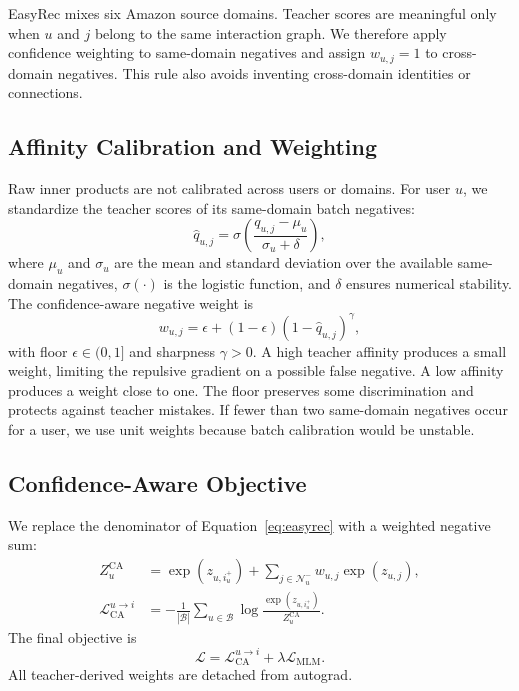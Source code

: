 \documentclass[11pt]{article}
\begin{document}
EasyRec mixes six Amazon source domains.
Teacher scores are meaningful only when $u$ and $j$ belong to the same interaction graph.
We therefore apply confidence weighting to same-domain negatives and assign $w_{u,j}=1$ to cross-domain negatives.
This rule also avoids inventing cross-domain identities or connections.

\subsection{Affinity Calibration and Weighting}

Raw inner products are not calibrated across users or domains.
For user $u$, we standardize the teacher scores of its same-domain batch negatives:
\begin{equation}
\hat q_{u,j}=
\sigma\left(\frac{q_{u,j}-\mu_u}{\sigma_u+\delta}\right),
\end{equation}
where $\mu_u$ and $\sigma_u$ are the mean and standard deviation over the available same-domain negatives, $\sigma(\cdot)$ is the logistic function, and $\delta$ ensures numerical stability.
The confidence-aware negative weight is
\begin{equation}
w_{u,j}=\epsilon+(1-\epsilon)(1-\hat q_{u,j})^\gamma,
\label{eq:weight}
\end{equation}
with floor $\epsilon\in(0,1]$ and sharpness $\gamma>0$.
A high teacher affinity produces a small weight, limiting the repulsive gradient on a possible false negative.
A low affinity produces a weight close to one.
The floor preserves some discrimination and protects against teacher mistakes.
If fewer than two same-domain negatives occur for a user, we use unit weights because batch calibration would be unstable.

\subsection{Confidence-Aware Objective}

We replace the denominator of Equation~\ref{eq:easyrec} with a weighted negative sum:
\begin{equation}
\begin{aligned}
Z_u^{\mathrm{CA}} &=
\exp(z_{u,i_u^+})+
\sum_{j\in\mathcal{N}_u^-}w_{u,j}\exp(z_{u,j}),\\
\mathcal{L}_{\mathrm{CA}}^{u\rightarrow i}
&=-\frac{1}{|\mathcal{B}|}\sum_{u\in\mathcal{B}}
\log\frac{\exp(z_{u,i_u^+})}{Z_u^{\mathrm{CA}}}.
\end{aligned}
\label{eq:caloss}
\end{equation}
The final objective is
\begin{equation}
\mathcal{L}=\mathcal{L}_{\mathrm{CA}}^{u\rightarrow i}
+\lambda\mathcal{L}_{\mathrm{MLM}}.
\end{equation}
All teacher-derived weights are detached from autograd.
\end{document}
